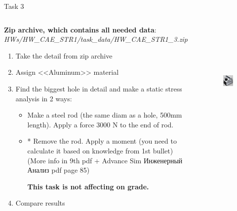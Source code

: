 \documentclass[aspectratio=169]{beamer}
\begin{document}
\begin{frame}[t]{Task 3}
    \vspace{-0.4cm}
    \begin{columns}[T,onlytextwidth]
        \begin{column}{0.59\textwidth}
            \scriptsize
            \textbf{Zip archive, which contains all needed data}: \textit{HWs/HW\_CAE\_STR1/task\_data/HW\_CAE\_STR1\_3.zip}
            \begin{enumerate}
                \item Take the detail from zip archive
                \item Assign <<Aluminum>> material
                \item Find the biggest hole in detail and make a static stress analysis in 2 ways:
                      \begin{itemize}
                        \scriptsize
                          \item Make a steel rod (the same diam as a hole, 500mm length). Apply a force 3000 N to the end of rod.
                          \item * Remove the rod. Apply a moment (you need to calculate it based on knowledge from 1st bullet) (More info in 9th pdf + Advance Sim Инженерный Анализ pdf page 85)
                          
                            \textbf{This task is not affecting on grade.}
                      \end{itemize}
                \item Compare results
            \end{enumerate}
        \end{column}
        \begin{column}{0.39\textwidth}
            \begin{figure}[H]
                \centering\includegraphics[height=6cm,width=1\textwidth,keepaspectratio]{HW_CAE_STR1_3.png}
                \label{fig:HW_CAE_STR1_3.png}
            \end{figure}
        \end{column}
    \end{columns}
\end{frame}
\end{document}
